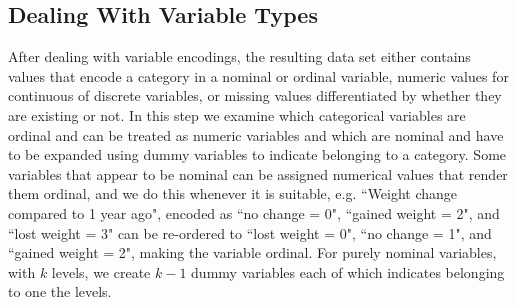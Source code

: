 \documentclass{article}
\begin{document}
\subsection*{Dealing With Variable Types}
After dealing with variable encodings, the resulting data set either contains values that encode a category in a nominal or ordinal variable, numeric values for continuous of discrete variables, or missing values differentiated by whether they are existing or not. In this step we examine which categorical variables are ordinal and can be treated as numeric variables and which are nominal and have to be expanded using dummy variables to indicate belonging to a category. Some variables that appear to be nominal can be assigned numerical values that render them ordinal, and we do this whenever it is suitable, e.g. ``Weight change compared to 1 year ago", encoded as ``no change = 0", ``gained weight = 2", and ``lost weight = 3" can be re-ordered to ``lost weight = 0", ``no change = 1", and ``gained weight = 2", making the variable ordinal. For purely nominal variables, with $k$ levels, we create $k-1$ dummy variables each of which indicates belonging to one the levels. 

\clearpage
\end{document}
